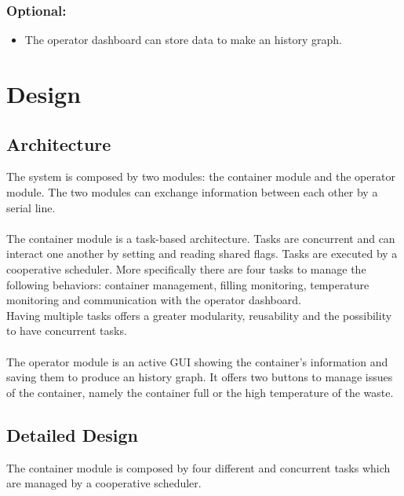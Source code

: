 \documentclass[a4paper,12pt]{report}
\begin{document}
        \subsection{Optional:}
            
            \begin{itemize}
                \item The operator dashboard can store data to make an history graph.
            \end{itemize}

\chapter{Design}

    \section{Architecture}

        The system is composed by two modules: the container module and the operator module.
        The two modules can exchange information between each other by a serial line.\\\\
        The container module is a task-based architecture. Tasks are concurrent and can interact one another by setting and reading shared flags. Tasks are executed by a cooperative scheduler.
        More specifically there are four tasks to manage the following behaviors: container management, filling monitoring, temperature monitoring and communication with the operator dashboard.\\
        Having multiple tasks offers a greater modularity, reusability and the possibility to have concurrent tasks.\\\\
        The operator module is an active GUI showing the container's information and saving them to produce an history graph.
        It offers two buttons to manage issues of the container, namely the container full or the high temperature of the waste.
    
    \section{Detailed Design}

        The container module is composed by four different and concurrent tasks which are managed by a cooperative scheduler. 
\end{document}

